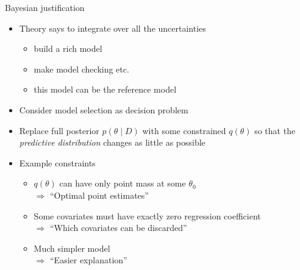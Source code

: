 \documentclass[t]{beamer}
\begin{document}
\begin{frame}{Bayesian justification}
  
  \begin{itemize}
  \item  Theory says to integrate over all the uncertainties
    \begin{itemize}
    \item build a rich model
    \item make model checking etc.
    \item this model can be the reference model
    \end{itemize}
  \item<2-> Consider model selection as decision problem
  \item<3-> Replace full posterior {\color{set11} $p(\theta \mid D)$} with
    some constrained {\color{set12} $q(\theta)$} so that the {\color{set13} \emph{predictive
      distribution}} changes as little as possible
  \item<4-> Example constraints
    \begin{itemize}
    \item {\color{set12} $q(\theta)$} can have only point mass at some $\theta_0$ \\
      $\Rightarrow$ ``Optimal point estimates''
    \item<5-> Some covariates must have exactly zero regression coefficient \\
      $\Rightarrow$ ``Which covariates can be discarded''
    \item<6-> Much simpler model \\
      $\Rightarrow$ ``Easier explanation''
    \end{itemize}
\end{itemize}

\end{frame}
\end{document}

